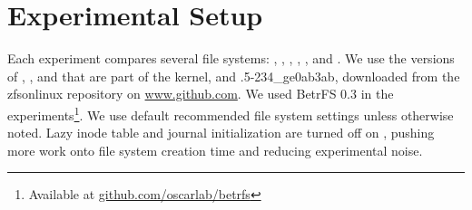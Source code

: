 \section{Experimental Setup}\label{sec:fsa-setup}

%
%

Each experiment compares several file systems: \betrfs, \btrfs, \ext, \ftwofs,
\xfs, and \zfs.  We use the versions of \xfs, \btrfs, \ext and \ftwofs that are
part of the \linuxver kernel, and .5-234\_ge0ab3ab, downloaded from the
zfsonlinux repository on \url{www.github.com}.  We used BetrFS 0.3 in the 
experiments\footnote{Available at \url{github.com/oscarlab/betrfs}}.
We use default recommended file system settings unless otherwise noted.  Lazy
inode table and journal initialization are turned off on \ext, pushing more
work onto file system creation time and reducing experimental noise. 

